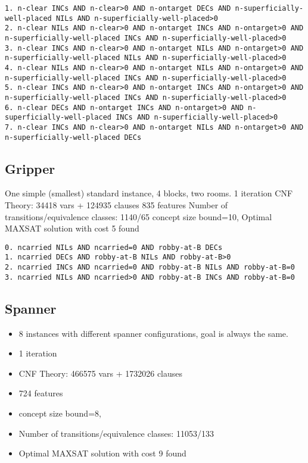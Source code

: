 \documentclass[a4paper]{article}
\begin{document}
\begin{Verbatim}[fontsize=\footnotesize]
1. n-clear INCs AND n-clear>0 AND n-ontarget DECs AND n-superficially-well-placed NILs AND n-superficially-well-placed>0
2. n-clear NILs AND n-clear>0 AND n-ontarget INCs AND n-ontarget>0 AND n-superficially-well-placed INCs AND n-superficially-well-placed>0
3. n-clear INCs AND n-clear>0 AND n-ontarget NILs AND n-ontarget>0 AND n-superficially-well-placed NILs AND n-superficially-well-placed>0
4. n-clear NILs AND n-clear>0 AND n-ontarget NILs AND n-ontarget>0 AND n-superficially-well-placed INCs AND n-superficially-well-placed>0
5. n-clear INCs AND n-clear>0 AND n-ontarget INCs AND n-ontarget>0 AND n-superficially-well-placed INCs AND n-superficially-well-placed>0
6. n-clear DECs AND n-ontarget INCs AND n-ontarget>0 AND n-superficially-well-placed INCs AND n-superficially-well-placed>0
7. n-clear INCs AND n-clear>0 AND n-ontarget NILs AND n-ontarget>0 AND n-superficially-well-placed DECs
\end{Verbatim}


\subsection{Gripper}
One simple (smallest) standard instance, 4 blocks, two rooms.
1 iteration
CNF Theory: 34418 vars + 124935 clauses
835 features
Number of transitions/equivalence classes: 1140/65
concept size bound=10,
Optimal MAXSAT solution with cost 5 found

\begin{Verbatim}[fontsize=\footnotesize]
0. ncarried NILs AND ncarried=0 AND robby-at-B DECs
1. ncarried DECs AND robby-at-B NILs AND robby-at-B>0
2. ncarried INCs AND ncarried=0 AND robby-at-B NILs AND robby-at-B=0
3. ncarried NILs AND ncarried>0 AND robby-at-B INCs AND robby-at-B=0
\end{Verbatim}


\subsection{Spanner}

\begin{itemize}
 \item 8 instances with different spanner configurations, goal is always the same.
 \item 1 iteration
 \item CNF Theory: 466575 vars + 1732026 clauses
 \item 724 features
 \item concept size bound=8,
 \item Number of transitions/equivalence classes: 11053/133
 \item Optimal MAXSAT solution with cost 9 found
\end{itemize}
\end{document}
